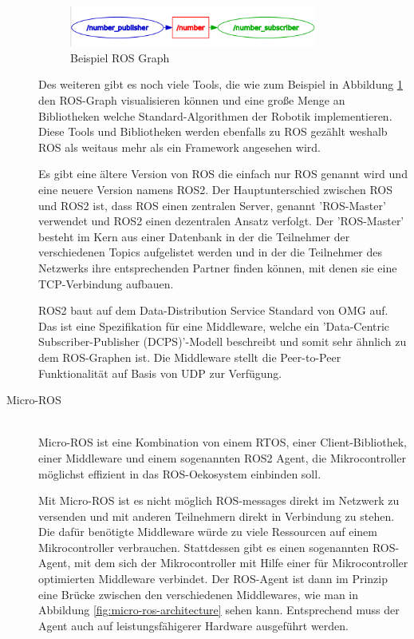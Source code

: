 \begin{flushleft}
\begin{description}
        \begin{figure}[h!]
            \centering
            \includegraphics[width=0.8\textwidth]{imgs/Grundbegriffe/graph_2_nodes_with_topic.png}
            \caption{Beispiel ROS Graph}
            \label{fig:ros_graph}%
        \end{figure}

        Des weiteren gibt es noch viele Tools, die wie zum Beispiel in Abbildung \ref{fig:ros_graph} den ROS-Graph visualisieren können und eine große Menge an Bibliotheken welche Standard-Algorithmen der Robotik implementieren.
        Diese Tools und Bibliotheken werden ebenfalls zu ROS gezählt weshalb ROS als weitaus mehr als ein Framework angesehen wird.

        Es gibt eine ältere Version von ROS die einfach nur ROS genannt wird und eine neuere Version namens ROS2.
        Der Hauptunterschied zwischen ROS und ROS2 ist, dass ROS einen zentralen Server, genannt 'ROS-Master' verwendet und ROS2 einen dezentralen Ansatz verfolgt.
        Der 'ROS-Master' besteht im Kern aus einer Datenbank in der die Teilnehmer der verschiedenen Topics aufgelistet werden und in der die Teilnehmer des Netzwerks ihre entsprechenden Partner finden können, mit denen sie eine TCP-Verbindung aufbauen.
        
        ROS2 baut auf dem Data-Distribution Service Standard von OMG auf. 
        Das ist eine Spezifikation für eine Middleware, welche ein 'Data-Centric Subscriber-Publisher (DCPS)'-Modell beschreibt und somit sehr ähnlich zu dem ROS-Graphen ist. 
        Die Middleware stellt die Peer-to-Peer Funktionalität auf Basis von UDP zur Verfügung.

        \item[Micro-ROS]\hfill\\
        Micro-ROS ist eine Kombination von einem RTOS, einer Client-Bibliothek, einer Middleware und einem sogenannten ROS2 Agent, 
        die Mikrocontroller möglichst effizient in das ROS-Oekosystem einbinden soll.
        
        Mit Micro-ROS ist es nicht möglich ROS-messages direkt im Netzwerk zu versenden und mit anderen Teilnehmern direkt in Verbindung zu stehen.
        Die dafür benötigte Middleware würde zu viele Ressourcen auf einem Mikrocontroller verbrauchen. 
        Stattdessen gibt es einen sogenannten ROS-Agent, mit dem sich der Mikrocontroller mit Hilfe einer für Mikrocontroller optimierten Middleware verbindet.
        Der ROS-Agent ist dann im Prinzip eine Brücke zwischen den verschiedenen Middlewares, wie man in Abbildung \ref{fig:micro-ros-architecture} sehen kann. Entsprechend muss der Agent auch auf leistungsfähigerer Hardware ausgeführt werden.    
        \cite{micro_ros_concepts}


\end{description}
\end{flushleft}
